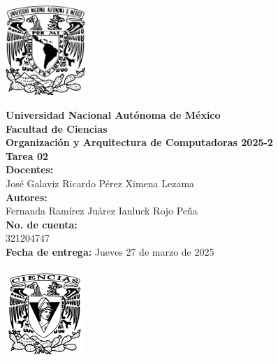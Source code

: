 \documentclass[12pt,letterpaper]{article}
\begin{document}
\begin{center}
  \begin{minipage}{3cm}
    \begin{center}
      \includegraphics[height=3.4cm]{../unam_logo.png}
    \end{center}
  \end{minipage}\hfill
  \begin{minipage}{10cm}
    \begin{center}
      \textbf{\Large Universidad Nacional Autónoma de México}\\[0.2cm]
      \textbf{\large Facultad de Ciencias}\\[0.2cm]
      \textbf{Organización y Arquitectura de Computadoras 2025-2}\\[0.4cm]
      \textbf{\Large Tarea 02}\\[0.1cm]
      \textbf{Docentes:}\\
      José Galaviz \hspace{1em} Ricardo Pérez \hspace{1em} Ximena Lezama\\[0.3cm]
      \textbf{Autores:}\\
      Fernanda Ramírez Juárez \quad Ianluck Rojo Peña\\[0.2cm]
      \textbf{No. de cuenta:}\\
      321204747 \\[0.2cm]
      \textbf{Fecha de entrega:} Jueves 27 de marzo de 2025
    \end{center}
  \end{minipage}\hfill
  \begin{minipage}{3cm}
    \begin{center}
      \includegraphics[height=3.4cm]{../fc_logo.png}
    \end{center}
  \end{minipage}
\end{center}
\end{document}
